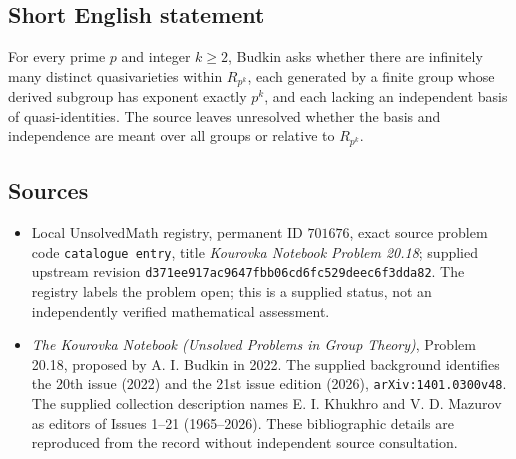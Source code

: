 \documentclass[11pt]{article}
\begin{document}
\subsection{Short English statement}
For every prime \(p\) and integer \(k\geq 2\), Budkin asks whether there are infinitely many distinct quasivarieties within \(R_{p^k}\), each generated by a finite group whose derived subgroup has exponent exactly \(p^k\), and each lacking an independent basis of quasi-identities. The source leaves unresolved whether the basis and independence are meant over all groups or relative to \(R_{p^k}\).
\subsection{Sources}
\begin{itemize}
\item Local UnsolvedMath registry, permanent ID \(701676\), exact source problem code \texttt{catalogue entry}, title \emph{Kourovka Notebook Problem 20.18}; supplied upstream revision \texttt{d371ee917ac9647fbb06cd6fc529deec6f3dda82}. The registry labels the problem open; this is a supplied status, not an independently verified mathematical assessment.
\item \emph{The Kourovka Notebook (Unsolved Problems in Group Theory)}, Problem 20.18, proposed by A. I. Budkin in 2022. The supplied background identifies the 20th issue (2022) and the 21st issue edition (2026), \texttt{arXiv:1401.0300v48}. The supplied collection description names E. I. Khukhro and V. D. Mazurov as editors of Issues 1--21 (1965--2026). These bibliographic details are reproduced from the record without independent source consultation.
\end{itemize}
\end{document}

